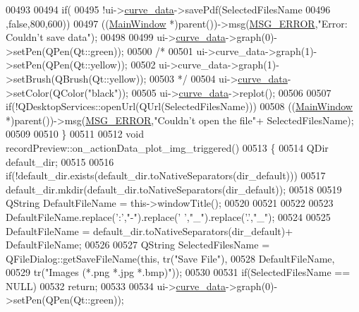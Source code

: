 \begin{DoxyCode}
00493 
00494       \textcolor{keywordflow}{if}(
00495         !ui->\hyperlink{a00028_a247d94481323c0bc4f8b6458a8a535dd}{curve\_data}->savePdf(SelectedFilesName
00496                                 ,\textcolor{keyword}{false},800,600))
00497             ((\hyperlink{a00006}{MainWindow} *)parent())->msg(\hyperlink{a00034_aa8a990825a5a62c89d2fb8b08d8a1070}{MSG\_ERROR},\textcolor{stringliteral}{"Error: Couldn't save data"});
00498 
00499        ui->\hyperlink{a00028_a247d94481323c0bc4f8b6458a8a535dd}{curve\_data}->graph(0)->setPen(QPen(Qt::green));
00500       \textcolor{comment}{/*}
00501 \textcolor{comment}{       ui->curve\_data->graph(1)->setPen(QPen(Qt::yellow));}
00502 \textcolor{comment}{       ui->curve\_data->graph(1)->setBrush(QBrush(Qt::yellow));}
00503 \textcolor{comment}{       */}
00504        ui->\hyperlink{a00028_a247d94481323c0bc4f8b6458a8a535dd}{curve\_data}->setColor(QColor(\textcolor{stringliteral}{"black"}));
00505        ui->\hyperlink{a00028_a247d94481323c0bc4f8b6458a8a535dd}{curve\_data}->replot();
00506 
00507        \textcolor{keywordflow}{if}(!QDesktopServices::openUrl(QUrl(SelectedFilesName)))
00508            ((\hyperlink{a00006}{MainWindow} *)parent())->msg(\hyperlink{a00034_aa8a990825a5a62c89d2fb8b08d8a1070}{MSG\_ERROR},\textcolor{stringliteral}{"Couldn't open the file"}+
      SelectedFilesName);
00509 
00510 \}
00511 
00512 \textcolor{keywordtype}{void} recordPreview::on\_actionData\_plot\_img\_triggered()
00513 \{
00514     QDir default\_dir;
00515 
00516     \textcolor{keywordflow}{if}(!default\_dir.exists(default\_dir.toNativeSeparators(dir\_default)))
00517         default\_dir.mkdir(default\_dir.toNativeSeparators(dir\_default));
00518 
00519     QString DefaultFileName = this->windowTitle();
00520 
00521 
00522 
00523     DefaultFileName.replace(\textcolor{charliteral}{':'},\textcolor{stringliteral}{"-"}).replace(\textcolor{charliteral}{' '},\textcolor{stringliteral}{"\_"}).replace(\textcolor{charliteral}{'.'},\textcolor{stringliteral}{"\_"});
00524 
00525     DefaultFileName = default\_dir.toNativeSeparators(dir\_default)+ DefaultFileName;
00526 
00527     QString SelectedFilesName = QFileDialog::getSaveFileName(\textcolor{keyword}{this}, tr(\textcolor{stringliteral}{"Save File"}),
00528                                                         DefaultFileName,
00529                                                          tr(\textcolor{stringliteral}{"Images (*.png *.jpg *.bmp)"}));
00530 
00531     \textcolor{keywordflow}{if}(SelectedFilesName == NULL)
00532         \textcolor{keywordflow}{return};
00533 
00534     ui->\hyperlink{a00028_a247d94481323c0bc4f8b6458a8a535dd}{curve\_data}->graph(0)->setPen(QPen(Qt::green));

\end{DoxyCode}
